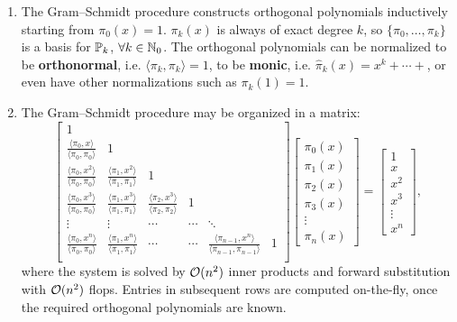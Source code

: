 \begin{remark}
\begin{enumerate}
\item The Gram--Schmidt procedure constructs orthogonal polynomials inductively starting from $\pi_0(x) = 1$. $\pi_k(x)$ is always of exact degree $k$, so $\{\pi_0,\ldots,\pi_k\}$ is a basis for $\P_k$, $\forall k\in\N_0$. The orthogonal polynomials can be normalized to be {\bf orthonormal}, i.e. $\langle\pi_k,\pi_k\rangle = 1$, to be {\bf monic}, i.e. $\hat{\pi}_k(x) = x^k + \cdots +$, or even have other normalizations such as $\pi_k(1)=1$.
\item The Gram--Schmidt procedure may be organized in a matrix:
\[
\begin{bmatrix}
1\\
\frac{\langle \pi_0, x\rangle}{\langle \pi_0,\pi_0\rangle} & 1\\
\frac{\langle \pi_0, x^2\rangle}{\langle \pi_0,\pi_0\rangle} & \frac{\langle \pi_1, x^2\rangle}{\langle \pi_1,\pi_1\rangle} & 1\\
\frac{\langle \pi_0, x^3\rangle}{\langle \pi_0,\pi_0\rangle} & \frac{\langle \pi_1, x^3\rangle}{\langle \pi_1,\pi_1\rangle} & \frac{\langle \pi_2, x^3\rangle}{\langle \pi_2,\pi_2\rangle} & 1\\
\vdots & \vdots & \cdots & \cdots & \ddots\\
\frac{\langle \pi_0, x^n\rangle}{\langle \pi_0,\pi_0\rangle} & \frac{\langle \pi_1, x^n\rangle}{\langle \pi_1,\pi_1\rangle} & \cdots & \cdots & \frac{\langle \pi_{n-1}, x^n\rangle}{\langle \pi_{n-1},\pi_{n-1}\rangle} & 1\\
\end{bmatrix}
\begin{bmatrix}
\pi_0(x)\\\pi_1(x)\\\pi_2(x)\\\pi_3(x)\\\vdots\\\pi_n(x)
\end{bmatrix}
=
\begin{bmatrix}
1\\x\\x^2\\x^3\\\vdots\\x^n
\end{bmatrix},
\]
where the system is solved by $\OO(n^2)$ inner products and forward substitution with $\OO(n^2)$ flops. Entries in subsequent rows are computed on-the-fly, once the required orthogonal polynomials are known.
\end{enumerate}
\end{remark}

